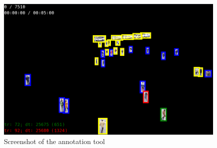 \begin{figure}
    \centering
    \includegraphics[width=\textwidth]{img/annotator_screenshot.png}
    \caption{Screenshot of the annotation tool}
    \label{fig:annotation_tool}
\end{figure}
